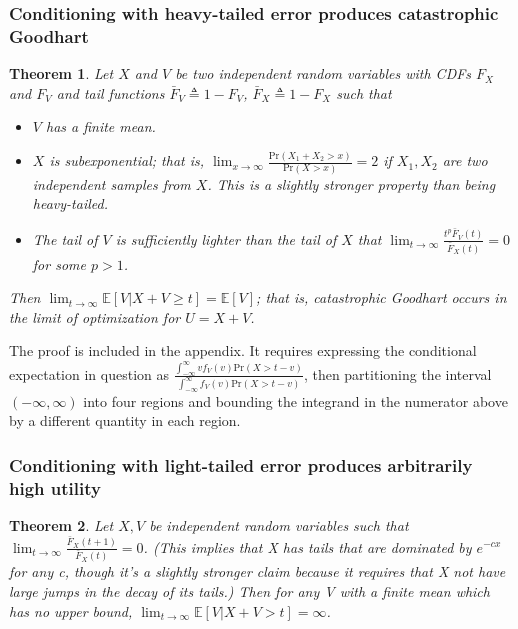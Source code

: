 \documentclass{article}
\newtheorem{theorem}{Theorem}
\begin{document}
\subsubsection{Conditioning with heavy-tailed error produces catastrophic Goodhart}
\begin{theorem}
    \label{thm5} Let $X$ and $V$ be two independent random variables with CDFs $F_X$ and $F_V$ and tail functions $\bar F_V \triangleq 1 - F_V$, $\bar F_X \triangleq 1 - F_X$ such that
    \begin{itemize}
        \item $V$ has a finite mean.
        \item $X$ is subexponential; that is, $\lim_{x\to\infty}\frac{\text{Pr}(X_1+X_2>x)}{\text{Pr}(X>x)} = 2$ if $X_1, X_2$ are two independent samples from $X$. This is a slightly stronger property than being heavy-tailed.
        \item The tail of $V$ is sufficiently lighter than the tail of $X$ that \(\lim_{t\to\infty}\frac{t^p\bar F_V(t)}{\bar F_X(t)} = 0\) for some \(p > 1\).
    \end{itemize}
    Then $\lim_{t \to \infty} \mathbb E[V | X + V \ge t] =\mathbb{E}[V]$; that is, catastrophic Goodhart occurs in the limit of optimization for $U=X+V$.
\end{theorem}

The proof is included in the appendix. It requires expressing the conditional expectation in question as $\frac{\int_{-\infty}^\infty vf_V(v)\text{Pr}(X>t-v)} {\int_{-\infty}^\infty f_V(v)\text{Pr}(X>t-v)}$, then partitioning the interval $(-\infty, \infty)$ into four regions and bounding the integrand in the numerator above by a different quantity in each region. 

\subsubsection{Conditioning with light-tailed error produces arbitrarily high utility}
\begin{theorem}
    \label{thm6}
    Let $X, V$ be independent random variables such that $\lim_{t\to\infty}\frac{\bar{F}_X(t+1)}{\bar{F}_X(t)}=0$. (This implies that X has tails that are dominated by $e^{-cx}$ for any c, though it's a slightly stronger claim because it requires that X not have large jumps in the decay of its tails.)
    Then for any V with a finite mean which has no upper bound, $\lim_{t\to\infty}\mathbb{E}[V|X+V > t] = \infty$. 
\end{theorem}
\end{document}
